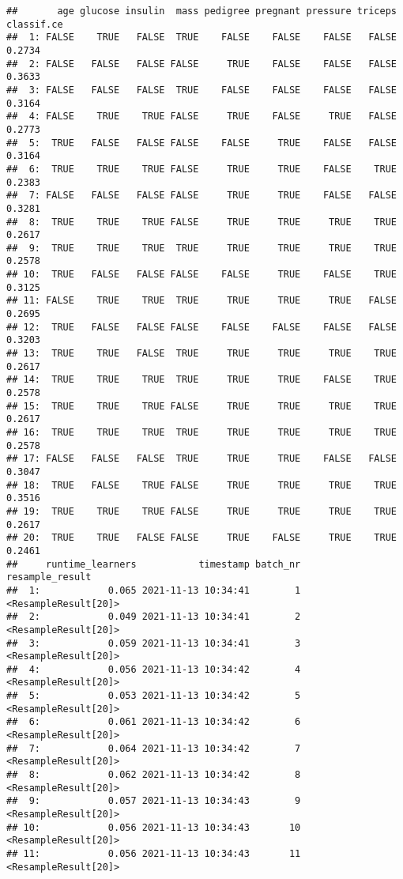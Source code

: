 \documentclass[
]{scrbook}
\begin{document}
\begin{verbatim}
##       age glucose insulin  mass pedigree pregnant pressure triceps classif.ce
##  1: FALSE    TRUE   FALSE  TRUE    FALSE    FALSE    FALSE   FALSE     0.2734
##  2: FALSE   FALSE   FALSE FALSE     TRUE    FALSE    FALSE   FALSE     0.3633
##  3: FALSE   FALSE   FALSE  TRUE    FALSE    FALSE    FALSE   FALSE     0.3164
##  4: FALSE    TRUE    TRUE FALSE     TRUE    FALSE     TRUE   FALSE     0.2773
##  5:  TRUE   FALSE   FALSE FALSE    FALSE     TRUE    FALSE   FALSE     0.3164
##  6:  TRUE    TRUE    TRUE FALSE     TRUE     TRUE    FALSE    TRUE     0.2383
##  7: FALSE   FALSE   FALSE FALSE     TRUE     TRUE    FALSE   FALSE     0.3281
##  8:  TRUE    TRUE    TRUE FALSE     TRUE     TRUE     TRUE    TRUE     0.2617
##  9:  TRUE    TRUE    TRUE  TRUE     TRUE     TRUE     TRUE    TRUE     0.2578
## 10:  TRUE   FALSE   FALSE FALSE    FALSE     TRUE    FALSE    TRUE     0.3125
## 11: FALSE    TRUE    TRUE  TRUE     TRUE     TRUE     TRUE   FALSE     0.2695
## 12:  TRUE   FALSE   FALSE FALSE    FALSE    FALSE    FALSE   FALSE     0.3203
## 13:  TRUE    TRUE   FALSE  TRUE     TRUE     TRUE     TRUE    TRUE     0.2617
## 14:  TRUE    TRUE    TRUE  TRUE     TRUE     TRUE    FALSE    TRUE     0.2578
## 15:  TRUE    TRUE    TRUE FALSE     TRUE     TRUE     TRUE    TRUE     0.2617
## 16:  TRUE    TRUE    TRUE  TRUE     TRUE     TRUE     TRUE    TRUE     0.2578
## 17: FALSE   FALSE   FALSE  TRUE     TRUE     TRUE    FALSE   FALSE     0.3047
## 18:  TRUE   FALSE    TRUE FALSE     TRUE     TRUE     TRUE    TRUE     0.3516
## 19:  TRUE    TRUE    TRUE FALSE     TRUE     TRUE     TRUE    TRUE     0.2617
## 20:  TRUE    TRUE   FALSE FALSE     TRUE    FALSE     TRUE    TRUE     0.2461
##     runtime_learners           timestamp batch_nr      resample_result
##  1:            0.065 2021-11-13 10:34:41        1 <ResampleResult[20]>
##  2:            0.049 2021-11-13 10:34:41        2 <ResampleResult[20]>
##  3:            0.059 2021-11-13 10:34:41        3 <ResampleResult[20]>
##  4:            0.056 2021-11-13 10:34:42        4 <ResampleResult[20]>
##  5:            0.053 2021-11-13 10:34:42        5 <ResampleResult[20]>
##  6:            0.061 2021-11-13 10:34:42        6 <ResampleResult[20]>
##  7:            0.064 2021-11-13 10:34:42        7 <ResampleResult[20]>
##  8:            0.062 2021-11-13 10:34:42        8 <ResampleResult[20]>
##  9:            0.057 2021-11-13 10:34:43        9 <ResampleResult[20]>
## 10:            0.056 2021-11-13 10:34:43       10 <ResampleResult[20]>
## 11:            0.056 2021-11-13 10:34:43       11 <ResampleResult[20]>

\end{verbatim}
\end{document}
